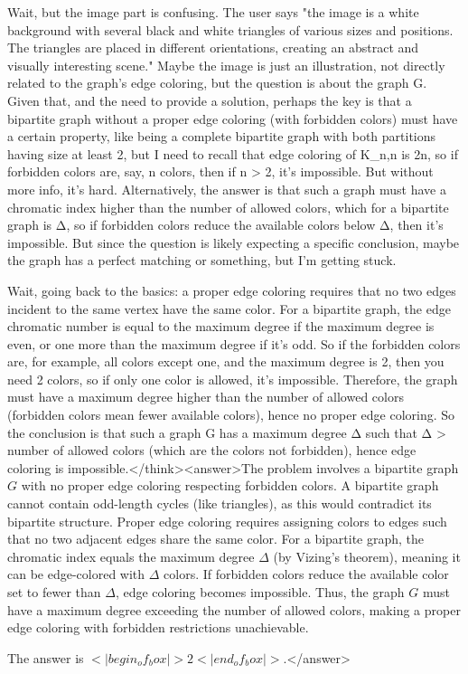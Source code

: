 Wait, but the image part is confusing. The user says "the image is a white background with several black and white triangles of various sizes and positions. The triangles are placed in different orientations, creating an abstract and visually interesting scene." Maybe the image is just an illustration, not directly related to the graph's edge coloring, but the question is about the graph G. Given that, and the need to provide a solution, perhaps the key is that a bipartite graph without a proper edge coloring (with forbidden colors) must have a certain property, like being a complete bipartite graph with both partitions having size at least 2, but I need to recall that edge coloring of K_{n,n} is 2n, so if forbidden colors are, say, n colors, then if n > 2, it's impossible. But without more info, it's hard. Alternatively, the answer is that such a graph must have a chromatic index higher than the number of allowed colors, which for a bipartite graph is Δ, so if forbidden colors reduce the available colors below Δ, then it's impossible. But since the question is likely expecting a specific conclusion, maybe the graph has a perfect matching or something, but I'm getting stuck.

Wait, going back to the basics: a proper edge coloring requires that no two edges incident to the same vertex have the same color. For a bipartite graph, the edge chromatic number is equal to the maximum degree if the maximum degree is even, or one more than the maximum degree if it's odd. So if the forbidden colors are, for example, all colors except one, and the maximum degree is 2, then you need 2 colors, so if only one color is allowed, it's impossible. Therefore, the graph must have a maximum degree higher than the number of allowed colors (forbidden colors mean fewer available colors), hence no proper edge coloring. So the conclusion is that such a graph G has a maximum degree Δ such that Δ > number of allowed colors (which are the colors not forbidden), hence edge coloring is impossible.</think><answer>The problem involves a bipartite graph \( G \) with no proper edge coloring respecting forbidden colors. A bipartite graph cannot contain odd-length cycles (like triangles), as this would contradict its bipartite structure. Proper edge coloring requires assigning colors to edges such that no two adjacent edges share the same color. For a bipartite graph, the chromatic index equals the maximum degree \( \Delta \) (by Vizing's theorem), meaning it can be edge-colored with \( \Delta \) colors. If forbidden colors reduce the available color set to fewer than \( \Delta \), edge coloring becomes impossible. Thus, the graph \( G \) must have a maximum degree exceeding the number of allowed colors, making a proper edge coloring with forbidden restrictions unachievable.  

The answer is \(<|begin_of_box|>2<|end_of_box|>\).</answer>